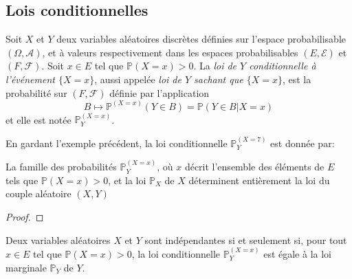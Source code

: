 \subsection{Lois conditionnelles}

\begin{definition}
	Soit $X$ et $Y$ deux variables aléatoires discrètes définies sur l'espace probabilisable $(\Omega,\mathcal{A})$, et à valeurs respectivement dans les espaces probabilisables $(E,\mathcal{E})$ et $(F,\mathcal{F})$. Soit $x \in E$ tel que $\mathbb{P}(X=x)>0$. La \emph{loi de $Y$ conditionnelle à l'événement $\{X=x\}$}, aussi appelée \emph{loi de $Y$ sachant que $\{X=x\}$}, est la probabilité sur $(F,\mathcal{F})$ définie par l'application
\[ 
B \mapsto \mathbb{P}^{(X=x)}(Y \in B) = \mathbb{P}(Y \in B | X=x)
\]
et elle est notée $\mathbb{P}_Y^{(X=x)}$.
\end{definition}

\begin{exemple}
	En gardant l'exemple précédent, la loi conditionnelle $\mathbb{P}_Y^{(X=7)}$ est donnée par:
\sld{	\[
	\mathbb{P}^{(X=7)} (Y=1)=\frac{1}{3},  \mathbb{P}^{(X=7)} (Y=3)=\frac{1}{3} \textrm{ et } \mathbb{P}^{(X=7)} (Y=5)=\frac{1}{3}.
\]}\pl{\rep{2cm}}
\end{exemple}
\sld{\vfill\pagebreak[5]}%

\begin{proposition}
La famille des probabilités $\mathbb{P}_Y^{(X=x)}$, où $x$ décrit l'ensemble des éléments de $E$ tels que $\mathbb{P}(X=x)>0$, et la loi $\mathbb{P}_X$ de $X$ déterminent entièrement la loi du couple aléatoire $(X,Y)$
\end{proposition}

\begin{proof}
 \pl{\rep{4cm}}
\end{proof}
\sld{\vfill\pagebreak[5]}%
\begin{proposition}
Deux variables aléatoires $X$ et $Y$ sont indépendantes si et seulement si, pour tout $x \in E$ tel que $\mathbb{P}(X=x)>0$, la loi conditionnelle $\mathbb{P}_Y^{(X=x)}$ est égale à la loi marginale $\mathbb{P}_Y$ de $Y$.
\end{proposition}

